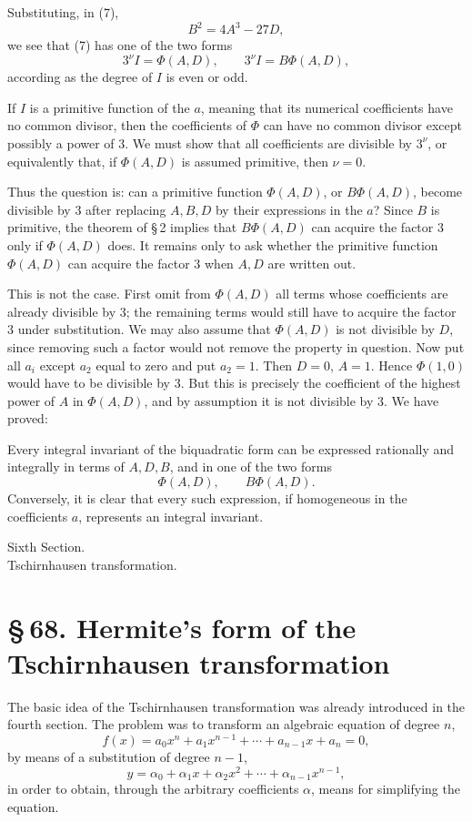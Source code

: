 \documentclass[11pt]{article}
\providecommand{\sect}[2]{\section*{\S\,#1. #2}}
\begin{document}
Substituting, in (7),
\[
 B^2=4A^3-27D,
\]
we see that (7) has one of the two forms
\begin{equation}
 3^\nu I=\Phi(A,D),
 \qquad
 3^\nu I=B\Phi(A,D),
\tag{8}
\end{equation}
according as the degree of $I$ is even or odd.

If $I$ is a primitive function of the $a$, meaning that its numerical coefficients have no common divisor, then the coefficients of $\Phi$ can have no common divisor except possibly a power of $3$. We must show that all coefficients are divisible by $3^\nu$, or equivalently that, if $\Phi(A,D)$ is assumed primitive, then $\nu=0$.

Thus the question is: can a primitive function $\Phi(A,D)$, or $B\Phi(A,D)$, become divisible by $3$ after replacing $A,B,D$ by their expressions in the $a$? Since $B$ is primitive, the theorem of \S\,2 implies that $B\Phi(A,D)$ can acquire the factor $3$ only if $\Phi(A,D)$ does. It remains only to ask whether the primitive function $\Phi(A,D)$ can acquire the factor $3$ when $A,D$ are written out.

This is not the case. First omit from $\Phi(A,D)$ all terms whose coefficients are already divisible by $3$; the remaining terms would still have to acquire the factor $3$ under substitution. We may also assume that $\Phi(A,D)$ is not divisible by $D$, since removing such a factor would not remove the property in question. Now put all $a_i$ except $a_2$ equal to zero and put $a_2=1$. Then $D=0$, $A=1$. Hence $\Phi(1,0)$ would have to be divisible by $3$. But this is precisely the coefficient of the highest power of $A$ in $\Phi(A,D)$, and by assumption it is not divisible by $3$. We have proved:

Every integral invariant of the biquadratic form can be expressed rationally and integrally in terms of $A,D,B$, and in one of the two forms
\[
 \Phi(A,D),
 \qquad
 B\Phi(A,D).
\]
Conversely, it is clear that every such expression, if homogeneous in the coefficients $a$, represents an integral invariant.

\begin{center}
{\large Sixth Section.}\\[0.4em]
{\Large Tschirnhausen transformation.}
\end{center}

\sect{68}{Hermite's form of the Tschirnhausen transformation}

The basic idea of the Tschirnhausen transformation was already introduced in the fourth section. The problem was to transform an algebraic equation of degree $n$,
\begin{equation}
 f(x)=a_0x^n+a_1x^{n-1}+\cdots+a_{n-1}x+a_n=0,
\tag{1}
\end{equation}
by means of a substitution of degree $n-1$,
\begin{equation}
 y=\alpha_0+\alpha_1x+\alpha_2x^2+\cdots+\alpha_{n-1}x^{n-1},
\tag{2}
\end{equation}
in order to obtain, through the arbitrary coefficients $\alpha$, means for simplifying the equation.
\end{document}

